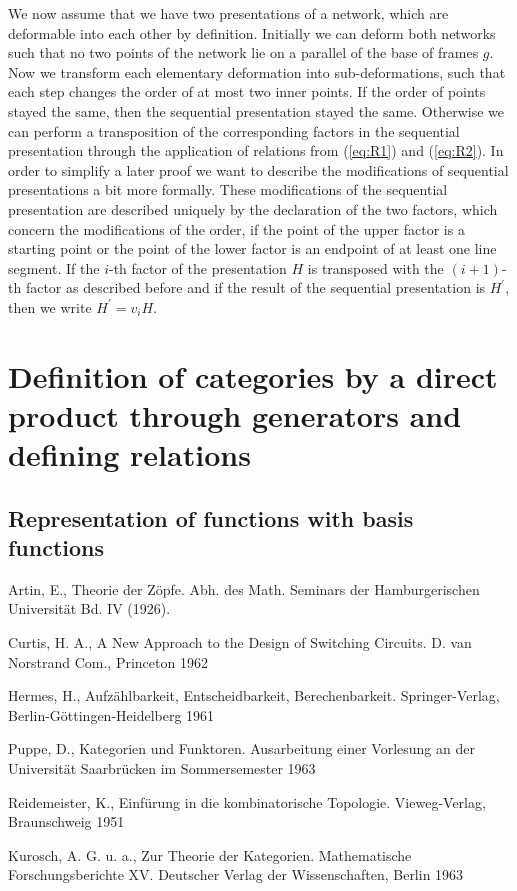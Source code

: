 \documentclass{article}
\begin{document}
We now assume that we have two presentations of a network, which are deformable into each other by definition. Initially we can deform both networks such that no two points of the network lie on a parallel of the base of frames $g$. 
Now we transform each elementary deformation into sub-deformations, such that each step changes the order of at most two inner points. 
If the order of points stayed the same, then the sequential presentation stayed the same. 
Otherwise we can perform a transposition of the corresponding factors in the sequential presentation through the application of relations from (\ref{eq:R1}) and (\ref{eq:R2}). 
In order to simplify a later proof we want to describe the modifications of sequential presentations a bit more formally. 
These modifications of the sequential presentation are described uniquely by the declaration of the two factors, which concern the modifications of the order, if the point of the upper factor is a starting point or the point of the lower factor is an endpoint of at least one line segment. 
If the $i$-th factor of the presentation $H$ is transposed with the $(i + 1)$-th factor as described before and if the result of the sequential presentation is $H^{'}$, then we write $H^{'} = v_{i} H$.

\section{Definition of categories by a direct product through generators and defining relations}
\subsection{Representation of functions with basis functions}
\label{basis-function-representation}

\begin{thebibliography}{9}
Artin, E., Theorie der Zöpfe. Abh. des Math. Seminars der Hamburgerischen Universit\"{a}t Bd. IV (1926).

Curtis, H. A., A New Approach to the Design of Switching Circuits. D. van Norstrand Com., Princeton 1962

Hermes, H., Aufz\"{a}hlbarkeit, Entscheidbarkeit, Berechenbarkeit. Springer-Verlag, Berlin-G\"{o}ttingen-Heidelberg 1961

Puppe, D., Kategorien und Funktoren. Ausarbeitung einer Vorlesung an der Universit\"{a}t Saarbr\"{u}cken im Sommersemester 1963

Reidemeister, K., Einf\"{u}rung in die kombinatorische Topologie. Vieweg-Verlag, Braunschweig 1951

Kurosch, A. G. u. a., Zur Theorie der Kategorien. Mathematische Forschungsberichte XV. Deutscher Verlag der Wissenschaften, Berlin 1963
\end{thebibliography}
\end{document}
